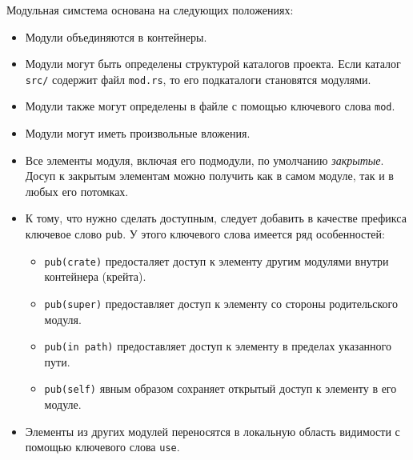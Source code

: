 \documentclass[%
	11pt,
	a4paper,
	utf8,
		]{article}
\begin{document}
Модульная симстема основана на следующих положениях:
\begin{itemize}
	\item Модули объединяются в контейнеры.
	
	\item Модули могут быть определены структурой каталогов проекта. Если каталог \verb|src/| содержит файл \verb|mod.rs|, то его подкаталоги становятся модулями.
	
	\item Модули также могут определены в файле с помощью ключевого слова \verb|mod|.
	
	\item Модули могут иметь произвольные вложения.
	
	\item Все элементы модуля, включая его подмодули, по умолчанию \emph{закрытые}. Досуп к закрытым элементам можно получить как в самом модуле, так и в любых его потомках.
	
	\item К тому, что нужно сделать доступным, следует добавить в качестве префикса ключевое слово \verb|pub|. У этого ключевого слова имеется ряд особенностей:
	\begin{itemize}
		\item \verb|pub(crate)| предосталяет доступ к элементу другим модулями внутри контейнера (крейта).
		
		\item \verb|pub(super)| предоставляет доступ к элементу со стороны родительского модуля.
		
		\item \verb|pub(in path)| предоставляет доступ к элементу в пределах указанного пути.
		
		\item \verb|pub(self)| явным образом сохраняет открытый доступ к элементу в его модуле.
		\end{itemize}
	
	\item Элементы из других модулей переносятся в локальную область видимости с помощью ключевого слова \verb|use|.
\end{itemize}








\begin{thebibliography}{99}
\end{thebibliography}


\lstlistoflistings{}
\end{document}
